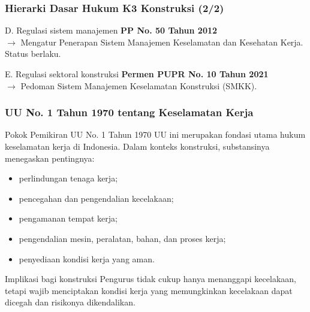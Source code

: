 \documentclass[../main.tex]{subfiles}
\begin{document}
\begin{frame}[mytitle=center,t,mycolor=digiPH_gray!30]
	\frametitle{Hierarki Dasar Hukum K3 Konstruksi (2/2)}

	\begin{block}{D. Regulasi sistem manajemen}
		\textbf{PP No. 50 Tahun 2012}\\
		$\rightarrow$ Mengatur Penerapan Sistem Manajemen Keselamatan dan Kesehatan Kerja. Status berlaku.
	\end{block}

	\begin{block}{E. Regulasi sektoral konstruksi}
		\textbf{Permen PUPR No. 10 Tahun 2021}\\
		$\rightarrow$ Pedoman Sistem Manajemen Keselamatan Konstruksi (SMKK).
	\end{block}
\end{frame}

\begin{frame}[mytitle=standard,c,mycolor=digiPH_creamy!20]
	\frametitle{UU No. 1 Tahun 1970 tentang Keselamatan Kerja}

	\begin{block}{Pokok Pemikiran UU No. 1 Tahun 1970}
		UU ini merupakan fondasi utama hukum keselamatan kerja di Indonesia. Dalam konteks konstruksi, substansinya menegaskan pentingnya:
		\begin{itemize}
			\item perlindungan tenaga kerja;
			\item pencegahan dan pengendalian kecelakaan;
			\item pengamanan tempat kerja;
			\item pengendalian mesin, peralatan, bahan, dan proses kerja;
			\item penyediaan kondisi kerja yang aman.
		\end{itemize}
	\end{block}

	\begin{alertblock}{Implikasi bagi konstruksi}
		Pengurus tidak cukup hanya menanggapi kecelakaan, tetapi wajib menciptakan kondisi kerja yang memungkinkan kecelakaan dapat dicegah dan risikonya dikendalikan.
	\end{alertblock}
\end{frame}
\end{document}
